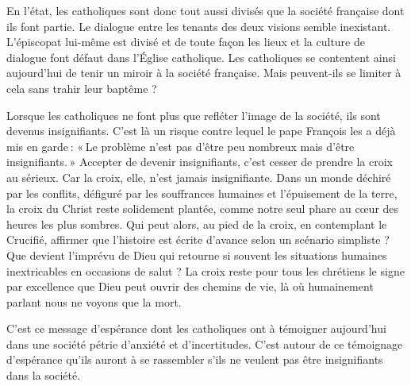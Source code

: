 En l’état, les catholiques sont donc tout aussi divisés que la société française dont ils font partie. Le dialogue entre les tenants des deux visions semble inexistant. L’épiscopat lui-même est divisé et de toute façon les lieux et la culture de dialogue font défaut dans l’Église catholique. Les catholiques se contentent ainsi aujourd’hui de tenir un miroir à la société française. Mais peuvent-ils se limiter à cela sans trahir leur baptême ?

Lorsque les catholiques ne font plus que refléter l’image de la société, ils sont devenus insignifiants. C’est là un risque contre lequel le pape François les a déjà mis en garde : « Le problème n’est pas d’être peu nombreux mais d’être insignifiants. » Accepter de devenir insignifiants, c’est cesser de prendre la croix au sérieux. Car la croix, elle, n’est jamais insignifiante. Dans un monde déchiré par les conflits, défiguré par les souffrances humaines et l’épuisement de la terre, la croix du Christ reste solidement plantée, comme notre seul phare au cœur des heures les plus sombres. Qui peut alors, au pied de la croix, en contemplant le Crucifié, affirmer que l’histoire est écrite d’avance selon un scénario simpliste ? Que devient l’imprévu de Dieu qui retourne si souvent les situations humaines inextricables en occasions de salut ? La croix reste pour tous les chrétiens le signe par excellence que Dieu peut ouvrir des chemins de vie, là où humainement parlant nous ne voyons que la mort.

C’est ce message d’espérance dont les catholiques ont à témoigner aujourd’hui dans une société pétrie d’anxiété et d’incertitudes. C’est autour de ce témoignage d’espérance qu’ils auront à se rassembler s’ils ne veulent pas être insignifiants dans la société.

